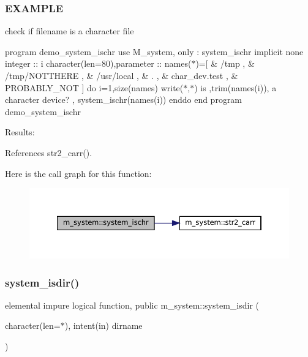 \subsubsection*{E\+X\+A\+M\+P\+LE}

check if filename is a character file

program demo\+\_\+system\+\_\+ischr use M\+\_\+system, only \+: system\+\_\+ischr implicit none integer \+:\+: i character(len=80),parameter \+:\+: names($\ast$)=\mbox{[} \& \textquotesingle{}/tmp \textquotesingle{}, \& \textquotesingle{}/tmp/\+N\+O\+T\+T\+H\+E\+RE \textquotesingle{}, \& \textquotesingle{}/usr/local \textquotesingle{}, \& \textquotesingle{}. \textquotesingle{}, \& \textquotesingle{}char\+\_\+dev.\+test \textquotesingle{}, \& \textquotesingle{}P\+R\+O\+B\+A\+B\+L\+Y\+\_\+\+N\+OT \textquotesingle{}\mbox{]} do i=1,size(names) write($\ast$,$\ast$)\textquotesingle{} is \textquotesingle{},trim(names(i)),\textquotesingle{} a character device? \textquotesingle{}, system\+\_\+ischr(names(i)) enddo end program demo\+\_\+system\+\_\+ischr

Results\+: 

References str2\+\_\+carr().

Here is the call graph for this function\+:\nopagebreak
\begin{figure}[H]
\begin{center}
\leavevmode
\includegraphics[width=350pt]{namespacem__system_a49f1d027d438aab86024660b0802768f_cgraph}
\end{center}
\end{figure}
\mbox{\label{namespacem__system_a7946ea976f399baff21caebcbe931f6d}} 
\subsubsection{\texorpdfstring{system\+\_\+isdir()}{system\_isdir()}}
{\footnotesize\ttfamily elemental impure logical function, public m\+\_\+system\+::system\+\_\+isdir (\begin{DoxyParamCaption}\item[{character(len=$\ast$), intent(in)}]{dirname }\end{DoxyParamCaption})}



